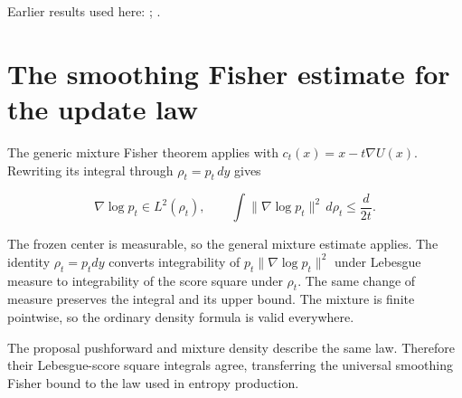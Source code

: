 \documentclass[11pt,a4paper]{article}
\begin{document}
Earlier results used here: \cite[Section~3.34.1]{LangevinLean2026ULASC}; \cite[Section~3.36.5]{LangevinLean2026ULASC}.

\section{\texorpdfstring{The smoothing Fisher estimate for the update law}{The smoothing Fisher estimate for the update law}}


The generic mixture Fisher theorem applies with \(c_t(x)=x-t\nabla U(x)\). Rewriting its integral through \(\rho_t=p_t\,dy\) gives

\[\nabla\log p_t\in L^2(\rho_t),\qquad\int\|\nabla\log p_t\|^2\,d\rho_t\le\frac d{2t}.\]

The frozen center is measurable, so the general mixture estimate applies. The identity \(\rho_t=p_tdy\) converts integrability of \(p_t\|\nabla\log p_t\|^2\) under Lebesgue measure to integrability of the score square under \(\rho_t\). The same change of measure preserves the integral and its upper bound. The mixture is finite pointwise, so the ordinary density formula is valid everywhere.



The proposal pushforward and mixture density describe the same law. Therefore their Lebesgue-score square integrals agree, transferring the universal smoothing Fisher bound to the law used in entropy production.
\end{document}
